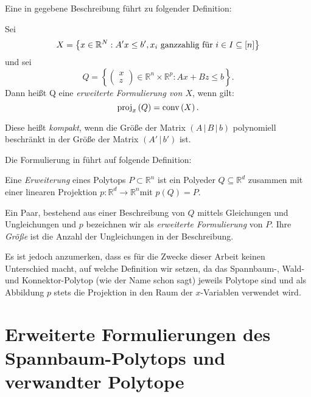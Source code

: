 \documentclass[10p,a4paper,BCOR = 12mm, DIV=15]{scrbook}
\begin{document}
Eine in \cite{springerlink:ext_form_comb_opt} gegebene Beschreibung führt zu folgender Definition:
\begin{Def}
Sei
\begin{displaymath}
X = \left\{x \in \mathbb{R}^N: A' x \leq b', x_i \textnormal{ ganzzahlig für } i \in I \subseteq \left[n\right]\right\}
\end{displaymath}
und sei
\begin{displaymath}
Q=\left\{\left(\begin{array}{c}
x \\
z
\end{array}\right) \in \mathbb{R}^n \times \mathbb{R}^p: A x + B z \leq b\right\}.
\end{displaymath}
Dann heißt Q eine \emph{erweiterte Formulierung von $X$}, wenn gilt:
\begin{displaymath}
\operatorname{proj}_x\left(Q\right) = \operatorname{conv} \left(X\right).
\end{displaymath}

Diese heißt \emph{kompakt}, wenn die Größe der Matrix $\left(A\,|\,B\,|\,b\right)$ polynomiell beschränkt in der Größe der Matrix $\left(A'\,|\,b'\right)$ ist.
\end{Def}

Die Formulierung in \cite{optima:ext_form_comb_opt} führt auf folgende Definition:

\begin{Def}
Eine \emph{Erweiterung} eines Polytops $P \subset \mathbb{R}^n$ ist ein Polyeder $Q \subseteq \mathbb{R}^d$ zusammen mit einer linearen Projektion $p: \mathbb{R}^d \rightarrow \mathbb{R}^n$mit $p\left(Q\right) = P$.

Ein Paar, bestehend aus einer Beschreibung von $Q$ mittels Gleichungen und Ungleichungen und $p$ bezeichnen wir als \emph{erweiterte Formulierung} von $P$. Ihre \emph{Größe} ist die Anzahl der Ungleichungen in der Beschreibung.
\end{Def}

Es ist jedoch anzumerken, dass es für die Zwecke dieser Arbeit keinen Unterschied macht, auf welche Definition wir setzen, da das Spannbaum-, Wald- und Konnektor-Polytop (wie der Name schon sagt) jeweils Polytope sind und als Abbildung $p$ stets die Projektion in den Raum der $x$-Variablen verwendet wird.

\part{Erweiterte Formulierungen des Spannbaum-Polytops und verwandter Polytope}
\end{document}
